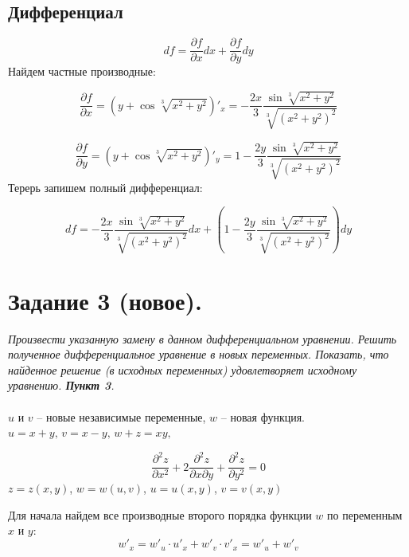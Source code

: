 \documentclass[a5paper, 10pt]{article}
\theoremstyle{definition}
\theoremstyle{plain}
\theoremstyle{remark}
\begin{document}
\subsection{Дифференциал}

\begin{equation}
df = \frac{\partial f}{\partial x} dx + \frac{\partial f}{\partial y} dy
\end{equation}
Найдем частные производные:

\begin{equation}
\frac{\partial f}{\partial x} = \left( y + \cos \sqrt[3]{x^2 + y^2} \right)'_x = -\frac{2x}{3} \frac{\sin \sqrt[3]{x^2 + y^2}}{\sqrt[3]{ \left( x^2 + y^2 \right)^2}}
\end{equation}

\begin{equation}
\frac{\partial f}{\partial y} = \left( y + \cos \sqrt[3]{x^2 + y^2} \right)'_y = 1 -\frac{2y}{3} \frac{\sin \sqrt[3]{x^2 + y^2}}{\sqrt[3]{ \left( x^2 + y^2 \right)^2}}
\end{equation}
Терерь запишем полный дифференциал:

\begin{equation}
df =  -\frac{2x}{3} \frac{\sin \sqrt[3]{x^2 + y^2}}{\sqrt[3]{ \left( x^2 + y^2 \right)^2}} dx + \left( 1 -\frac{2y}{3} \frac{\sin \sqrt[3]{x^2 + y^2}}{\sqrt[3]{ \left( x^2 + y^2 \right)^2}}  \right) dy
\end{equation}

\newpage

\section{Задание 3 (новое).}

\textit{Произвести указанную замену в данном дифференциальном уравнении. Решить полученное дифференциальное уравнение в новых переменных. Показать, что найденное решение (в исходных переменных) удовлетворяет исходному уравнению. \textbf{Пункт 3}.}\\
\\
$u$ и $v$ -- новые независимые переменные, $w$ -- новая функция. $u=x+y, \, v = x - y, \, w+z = xy,$

\begin{equation}
\frac{\partial^2 z}{\partial x^2} + 2 \frac{\partial^2 z}{\partial x \partial y} + \frac{\partial^2 z}{\partial y^2} = 0
\end{equation}
 $z=z(x, y)$, $w=w(u, v)$, $u = u(x, y)$, $v = v(x, y)$

Для начала найдем все производные второго порядка функции $w$ по переменным $x$ и $y$:
\begin{equation}
w'_x = w'_u \cdot u'_x + w'_v \cdot v'_x = w'_u + w'_v
\end{equation}
\end{document}
